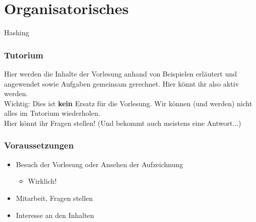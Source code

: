 





\graphicspath{{../figures/}}



\section{Organisatorisches}

\aboutMeFrame

\begin{headframe}
	Hashing
\end{headframe}

\framePrevEpisode

\begin{frame}[t]
	\frametitle{Tutorium}
	Hier werden die Inhalte der Vorlesung anhand von Beispielen erläutert und angewendet sowie Aufgaben gemeinsam gerechnet. Hier könnt ihr also aktiv werden. \\ Wichtig: Dies ist \textbf{kein} Ersatz für die Vorlesung. Wir können (und werden) nicht alles im Tutorium wiederholen. \\[2em]
	\pause
	Hier könnt ihr Fragen stellen! (Und bekommt auch meistens eine Antwort...)

\end{frame}

\begin{frame}
	\frametitle{Voraussetzungen}
	\begin{itemize}
		\item Besuch der Vorlesung oder Ansehen der Aufzeichnung
		\begin{itemize} \item Wirklich! \end{itemize}
		\item Mitarbeit, Fragen stellen
		\item Interesse an den Inhalten
	\end{itemize}
\end{frame}

